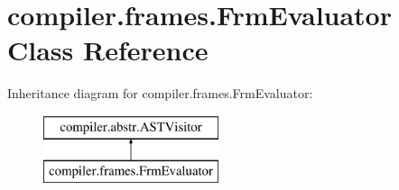 \hypertarget{classcompiler_1_1frames_1_1_frm_evaluator}{}\section{compiler.\+frames.\+Frm\+Evaluator Class Reference}
\label{classcompiler_1_1frames_1_1_frm_evaluator}
Inheritance diagram for compiler.\+frames.\+Frm\+Evaluator\+:\begin{figure}[H]
\begin{center}
\leavevmode
\includegraphics[height=2.000000cm]{classcompiler_1_1frames_1_1_frm_evaluator}
\end{center}
\end{figure}
